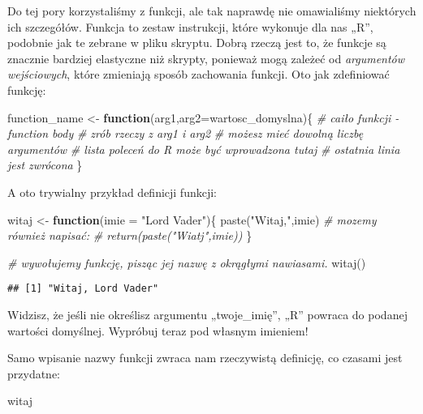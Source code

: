 \documentclass[
]{article}
\newenvironment{Shaded}{\begin{snugshade}}{\end{snugshade}}
\newcommand{\AttributeTok}[1]{\textcolor[rgb]{0.77,0.63,0.00}{#1}}
\newcommand{\CommentTok}[1]{\textcolor[rgb]{0.56,0.35,0.01}{\textit{#1}}}
\newcommand{\ControlFlowTok}[1]{\textcolor[rgb]{0.13,0.29,0.53}{\textbf{#1}}}
\newcommand{\FunctionTok}[1]{\textcolor[rgb]{0.00,0.00,0.00}{#1}}
\newcommand{\NormalTok}[1]{#1}
\newcommand{\OtherTok}[1]{\textcolor[rgb]{0.56,0.35,0.01}{#1}}
\newcommand{\StringTok}[1]{\textcolor[rgb]{0.31,0.60,0.02}{#1}}
\begin{document}
Do tej pory korzystaliśmy z funkcji, ale tak naprawdę nie omawialiśmy
niektórych ich szczegółów. Funkcja to zestaw instrukcji, które wykonuje
dla nas „R'', podobnie jak te zebrane w pliku skryptu. Dobrą rzeczą jest
to, że funkcje są znacznie bardziej elastyczne niż skrypty, ponieważ
mogą zależeć od \emph{argumentów wejściowych}, które zmieniają sposób
zachowania funkcji. Oto jak zdefiniować funkcję:

\begin{Shaded}
\begin{Highlighting}[]
\NormalTok{function\_name }\OtherTok{\textless{}{-}} \ControlFlowTok{function}\NormalTok{(arg1,}\AttributeTok{arg2=}\NormalTok{wartosc\_domyslna)\{}
  \CommentTok{\# caiło funkcji {-} function body}
  \CommentTok{\# zrób rzeczy z arg1 i arg2}
  \CommentTok{\# możesz mieć dowolną liczbę argumentów}
  \CommentTok{\# lista poleceń do \textasciigrave{}R\textasciigrave{} może być wprowadzona tutaj}
  \CommentTok{\# ostatnia linia jest zwrócona}
\NormalTok{\}}
\end{Highlighting}
\end{Shaded}

A oto trywialny przykład definicji funkcji:

\begin{Shaded}
\begin{Highlighting}[]
\NormalTok{witaj }\OtherTok{\textless{}{-}} \ControlFlowTok{function}\NormalTok{(}\AttributeTok{imie =} \StringTok{"Lord Vader"}\NormalTok{)\{}
  \FunctionTok{paste}\NormalTok{(}\StringTok{"Witaj,"}\NormalTok{,imie)}
  \CommentTok{\# mozemy również napisać:}
  \CommentTok{\# return(paste("Wiatj",imie))}
\NormalTok{\}}

\CommentTok{\# wywołujemy funkcję, pisząc jej nazwę z okrągłymi nawiasami.}
\FunctionTok{witaj}\NormalTok{()}
\end{Highlighting}
\end{Shaded}

\begin{verbatim}
## [1] "Witaj, Lord Vader"
\end{verbatim}

Widzisz, że jeśli nie określisz argumentu „twoje\_imię'', „R'' powraca
do podanej wartości domyślnej. Wypróbuj teraz pod własnym imieniem!

Samo wpisanie nazwy funkcji zwraca nam rzeczywistą definicję, co czasami
jest przydatne:

\begin{Shaded}
\begin{Highlighting}[]
\NormalTok{witaj}
\end{Highlighting}
\end{Shaded}
\end{document}
